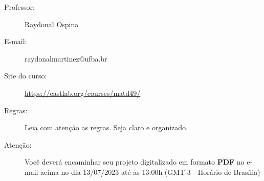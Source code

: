 \documentclass[a4paper,10pt,oneside,twocolumn]{Config/milktest}
\begin{document}
\beb
{\small
\begin{description}
\item[Professor:] Raydonal Ospina
\item[E-mail:] raydonalmartinez@ufba.br
\item[Site do curso:] \url{https://castlab.org/courses/matd49/}

\item[Regras:] Leia com atenção as regras. Seja claro e organizado. 

\item[Atenção:] Você deverá encaminhar seu projeto digitalizado em formato {\bf PDF} no e-mail acima no dia 13/07/2023 até as 13:00h (GMT-3 - Horário de Brasília) 
\end{description}
}
\eeb

\balance
\end{document}
